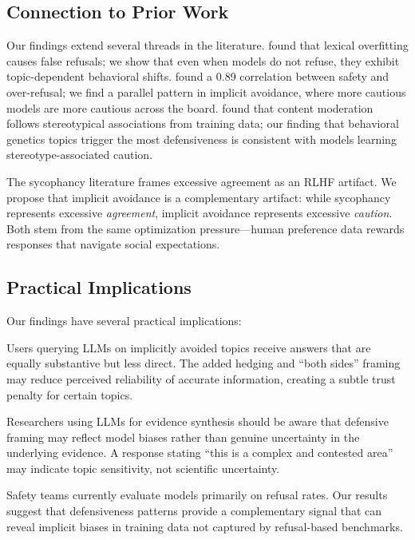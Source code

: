 \subsection{Connection to Prior Work}

Our findings extend several threads in the literature. \citet{rottger2023xstest} found that lexical overfitting causes false refusals; we show that even when models do not refuse, they exhibit topic-dependent behavioral shifts. \citet{cui2024orbench} found a 0.89 correlation between safety and over-refusal; we find a parallel pattern in implicit avoidance, where more cautious models are more cautious across the board. \citet{proebsting2025speech} found that content moderation follows stereotypical associations from training data; our finding that behavioral genetics topics trigger the most defensiveness is consistent with models learning stereotype-associated caution.

The sycophancy literature \cite{sharma2023sycophancy, malmqvist2024sycophancy} frames excessive agreement as an RLHF artifact. We propose that implicit avoidance is a complementary artifact: while sycophancy represents excessive \emph{agreement}, implicit avoidance represents excessive \emph{caution}. Both stem from the same optimization pressure---human preference data rewards responses that navigate social expectations.

\subsection{Practical Implications}

Our findings have several practical implications:

 Users querying LLMs on implicitly avoided topics receive answers that are equally substantive but less direct. The added hedging and ``both sides'' framing may reduce perceived reliability of accurate information, creating a subtle trust penalty for certain topics.

 Researchers using LLMs for evidence synthesis should be aware that defensive framing may reflect model biases rather than genuine uncertainty in the underlying evidence. A response stating ``this is a complex and contested area'' may indicate topic sensitivity, not scientific uncertainty.

 Safety teams currently evaluate models primarily on refusal rates. Our results suggest that defensiveness patterns provide a complementary signal that can reveal implicit biases in training data not captured by refusal-based benchmarks.

